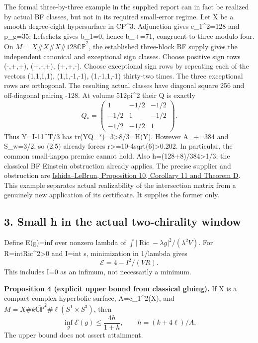 \documentclass[
  10pt,
]{article}
\begin{document}
The formal three-by-three example in the supplied report can in fact be
realized by actual BF classes, but not in its required small-error
regime. Let X be a smooth degree-eight hypersurface in CP\^{}3.
Adjunction gives c\_1\^{}2=128 and p\_g=35; Lefschetz gives b\_1=0,
hence b\_+=71, congruent to three modulo four. On
\(M=X\#X\#X\#128\overline{\mathbb{CP}}^2\), the established three-block
BF supply gives the independent canonical and exceptional sign classes.
Choose positive sign rows (-,+,+), (+,-,+), (+,+,-). Choose exceptional
sign rows by repeating each of the vectors (1,1,1,1), (1,1,-1,-1),
(1,-1,1,-1) thirty-two times. The three exceptional rows are orthogonal.
The resulting actual classes have diagonal square 256 and off-diagonal
pairing -128. At volume 512pi\^{}2 their Q is exactly \[
 Q_* = \begin{pmatrix}1&-1/2&-1/2\\-1/2&1&-1/2\\-1/2&-1/2&1\end{pmatrix}.
\] Thus Y=I-11\^{}T/3 has tr(YQ\_*)=3\textgreater8/3=H(Y). However
A\_+=384 and S\_w=3/2, so (2.5) already forces
r\textgreater=10-4sqrt(6)\textgreater0.202. In particular, the common
small-kappa premise cannot hold. Also h=(128+8)/384\textgreater1/3; the
classical BF Einstein obstruction already applies. The precise supplier
and obstruction are
\href{https://arxiv.org/pdf/math/0111228}{Ishida--LeBrun, Proposition
10, Corollary 11 and Theorem D}. This example separates actual
realizability of the intersection matrix from a genuinely new
application of its certificate. It supplies the former only.

\hypertarget{small-h-in-the-actual-two-chirality-window}{%
\subsection{3. Small h in the actual two-chirality
window}\label{small-h-in-the-actual-two-chirality-window}}

Define E(g)=inf over nonzero lambda of
\(\int|\operatorname{Ric}-\lambda g|^2/(\lambda^2 V)\). For
R=int\textbar Ric\textbar\^{}2\textgreater0 and I=int s, minimization in
1/lambda gives \[
 \mathcal E=4-I^2/(VR).                                  \tag{3.1}
\] This includes I=0 as an infimum, not necessarily a minimum.

\textbf{Proposition 4 (explicit upper bound from classical gluing).} If
X is a compact complex-hyperbolic surface, A=c\_1\^{}2(X), and
\(M=X\#k\overline{\mathbb{CP}}^2\#\ell(S^1\times S^3)\), then \[
 \inf_g\mathcal E(g)\le\frac{4h}{1+h},\qquad h=(k+4\ell)/A. \tag{3.2}
\] The upper bound does not assert attainment.
\end{document}

